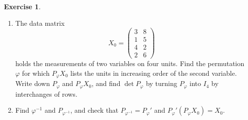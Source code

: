 \documentclass[12pt]{article}
\theoremstyle{definition}
\newtheorem{exercise}{Exercise}
\begin{document}
\begin{exercise}\label{r5d-dr-permutations}
\begin{enumerate}
\item The data matrix
\[
X_0=\begin{pmatrix}3&8\\1&5\\4&2\\2&6\end{pmatrix}
\]
holds the measurements of two variables on four units. Find the permutation \(\varphi\) for which \(P_\varphi X_0\)
lists the units in increasing order of the second variable. Write down \(P_\varphi\) and \(P_\varphi X_0\), and find
\(\det P_\varphi\) by turning \(P_\varphi\) into \(I_4\) by interchanges of rows.
\item Find \(\varphi^{-1}\) and \(P_{\varphi^{-1}}\), and check that \(P_{\varphi^{-1}}=P_\varphi'\) and
\(P_\varphi'(P_\varphi X_0)=X_0\).
\end{enumerate}
\end{exercise}
\end{document}
